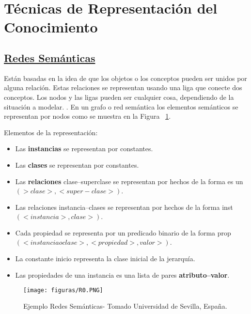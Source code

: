 \documentclass[10pt,conference]{IEEEtran}
\begin{document}
\section{\textbf{Técnicas de Representación del Conocimiento}} 

\subsection{\underline{\textbf{Redes Semánticas}}}
Están basadas en la idea de que los objetos o los conceptos pueden ser unidos por alguna relación.
Estas relaciones se representan usando una liga que conecte dos conceptos. Los nodos y las ligas pueden ser cualquier cosa, dependiendo de la situación a modelar. \citep{tema4pdf46}. En un grafo o red semántica los elementos semánticos se representan por nodos como se muestra en la Figura ~\ref{R0}.

Elementos de la representación:
\begin{itemize}
    \item Las \textbf{instancias} se representan por constantes.
    \item Las \textbf{clases} se representan por constantes.
    \item Las \textbf{relaciones} clase–superclase se representan por hechos de la forma es un $(> clase>,<super-clase>)$.
    \item Las relaciones instancia–clases se representan por hechos de la forma inst
    $(<instancia>,clase>)$.
    \item Cada propiedad se representa por un predicado binario de la forma
    prop $(<instancia o clase>,<propiedad>,valor>)$.
    \item La constante inicio representa la clase inicial de la jerarquía.
    \item Las propiedades de una instancia es una lista de pares \textbf{atributo–valor}.
\end{itemize}

\begin{figure}[H]
\begin{center}
\texttt{[image: figuras/R0.PNG]}
\caption{Ejemplo Redes Semánticas- Tomado Universidad de Sevilla, España.}
\label{R0} 
\end{center}
\end{figure}
\end{document}
